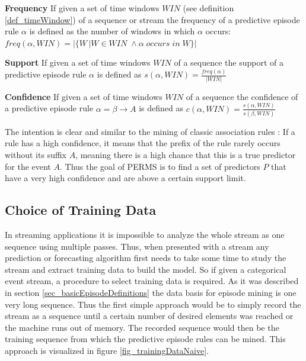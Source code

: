 \begin{mydef}
\label{def_frequency}
\textbf{Frequency} If given a set of time windows $WIN$ (see definition \ref{def_timeWindow}) of a sequence or stream the frequency of a predictive episode rule $\alpha$ is defined as the number of windows in which $\alpha$ occurs: $freq(\alpha,WIN) = |\{W\,|W \in WIN\; \land \alpha\; occurs \; in \; W\}|$
\end{mydef}

\begin{mydef}
\label{def_support}
\textbf{Support} If given a set of time windows $WIN$ of a sequence the support of a predictive episode rule $\alpha$ is defined as $s(\alpha,WIN) = \frac{freq(\alpha)}{|WIN|}$
\end{mydef}

\begin{mydef}
\label{def_confidence}
\textbf{Confidence} If given a set of time windows $WIN$ of a sequence the confidence of a predictive episode rule $\alpha = \beta \rightarrow A$ is defined as $c(\alpha,WIN) = \frac{s(\alpha,WIN)}{s(\beta,WIN)}$ \cite{meger2004constraint}
\end{mydef}

The intention is clear and similar to the mining of classic association rules \cite{agrawal1994fast}: If a rule has a high confidence, it means that the prefix of the rule rarely occurs without its suffix $A$, meaning there is a high chance that this is a true predictor for the event $A$. Thus the goal of PERMS is to find a set of predictors $P$ that have a very high confidence and are above a certain support limit.

\subsection{Choice of Training Data}
In streaming applications it is impossible to analyze the whole stream as one sequence using multiple passes. Thus, when presented with a stream any prediction or forecasting algorithm first needs to take some time to study the stream and extract training data to build the model. So if given a categorical event stream, a procedure to select training data is required. As it was described in section \ref{sec_basicEpisodeDefinitions} the data basis for episode mining is one very long sequence. Thus the first simple approach would be to simply record the stream as a sequence until a certain number of desired elements was reached or the machine runs out of memory. The recorded sequence would then be the training sequence from which the predictive episode rules can be mined. This approach is visualized in figure \ref{fig_trainingDataNaive}.

